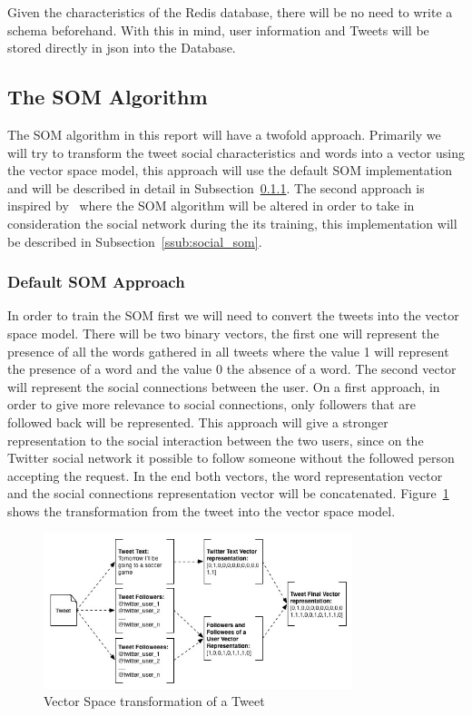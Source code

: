 Given the characteristics of the Redis database, there will be no need to write a schema beforehand. With this in mind, user information and Tweets will be stored directly in json into the Database.

\subsection{The SOM Algorithm} %
\label{sub:implementing_the_som}
The SOM algorithm in this report will have a twofold approach. Primarily we will try to transform the tweet social characteristics and words into a vector using the vector space model, this approach will use the default SOM implementation and will be described in detail in Subsection~\ref{ssub:default_som_approach_}. The second approach is inspired by~\citet{Bacao2005} where the SOM algorithm will be altered in order to take in consideration the social network during the its training, this implementation will be described in Subsection~\ref{ssub:social_som}.

\subsubsection{Default SOM Approach } %
\label{ssub:default_som_approach_} In order to train the SOM first we will need to convert the tweets into the vector space model. There will be two binary vectors, the first one will represent the presence of all the words gathered in all tweets where the value 1 will  represent the presence of a word and the value 0 the absence of a word. The second vector will represent the social connections between the user. On a first approach, in order to  give more relevance to social connections, only followers that are followed back will be represented. This approach will give a stronger representation to the social interaction between the two users, since on the Twitter social network it possible to follow someone without the followed person accepting the request. In the end both vectors, the word representation vector and the social connections representation vector will be concatenated. Figure~\ref{fig:vsm} shows the transformation from the tweet into the vector space model. 

\begin{figure}[tb]
  \begin{center}
    \includegraphics[width=9cm]{images/10_tweet_svm_transform.jpg}
  \end{center}
  \caption{Vector Space transformation of a Tweet}
  \label{fig:vsm}
\end{figure}


